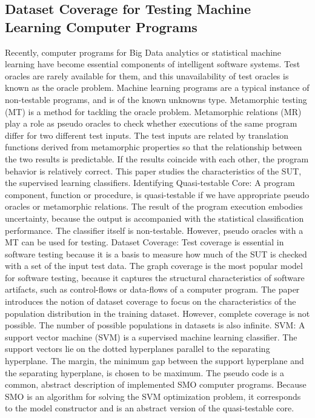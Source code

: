 \subsection{Dataset Coverage for Testing Machine Learning Computer Programs \cite{Nakajima2016}}
Recently, computer programs for Big Data analytics or statistical machine learning have become essential components of intelligent software systems. Test oracles are rarely available for them, and this unavailability of test oracles is known as the oracle problem. Machine learning programs are  a typical instance of non-testable programs, and is of the known unknowns type. Metamorphic testing (MT) is a method for tackling the oracle problem. Metamorphic relations (MR) play a role as pseudo oracles to check whether executions of the same program differ for two different test inputs. The test inputs are related by translation functions derived from metamorphic properties so that the relationship between the two results is predictable. If the results coincide with each other, the program behavior is relatively correct.
This paper studies the characteristics of the SUT, the supervised learning classifiers.
Identifying Quasi-testable Core: A program component, function or procedure, is quasi-testable if we have appropriate pseudo oracles or metamorphic relations. The result of the program execution embodies uncertainty, because the output is accompanied with the statistical classification performance. The classifier itself is non-testable. However, pseudo oracles with a MT can be used for testing.
Dataset Coverage: Test coverage is essential in software testing because it is a basis to measure how much of the SUT is checked with a set of the input test data. The graph coverage is the most popular model for software testing, because it captures the structural characteristics of software artifacts, such as control-flows or data-flows of a computer program. The paper introduces the notion of dataset coverage to focus on the characteristics of the population distribution in the training dataset. However, complete coverage is not possible. The number of possible populations in datasets is also infinite.
SVM: A support vector machine (SVM)  is a supervised machine learning classifier. The support vectors lie on the dotted hyperplanes parallel to the separating hyperplane. The margin, the minimum gap between the support hyperplane and the separating hyperplane, is chosen to be maximum. The pseudo code is a common, abstract description of implemented SMO computer programs. Because SMO is an algorithm for solving the SVM optimization problem, it corresponds to the model constructor and is an abstract version of the quasi-testable core.

